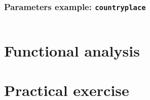 \documentclass[11pt]{beamer}
\begin{document}
\begin{frame}[fragile]
\frametitle{Parameters example: \texttt{countryplace}}
\scriptsize
\begin{lstlisting}[language=lekta]

\end{lstlisting}
\end{frame}

	
\section{Functional analysis}

\begin{frame}
\end{frame}

\section{Practical exercise}

\begin{frame}
\end{frame}
\end{document}
